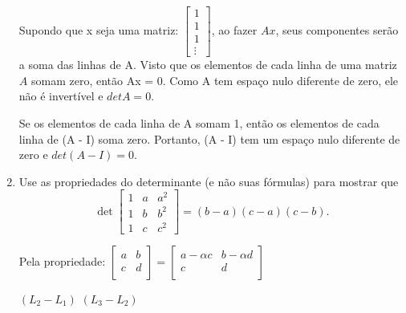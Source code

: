 \documentclass[leqno]{article}
\numberwithin{equation}{section}
\begin{document}
\begin{enumerate}
		\begin{sol}
			Supondo que x seja uma matriz:
			$\begin{bmatrix}
				1 \\
				1 \\
				1 \\
				\vdots
			\end{bmatrix}$, ao fazer $Ax$, seus componentes serão a soma das linhas de A. Visto que os elementos de cada linha de uma matriz $A$ somam zero, então Ax = 0. Como A tem espaço nulo diferente de zero, ele não é invertível e $det A = 0$.
		
			Se os elementos de cada linha de A somam 1, então os elementos de cada
			linha de (A - I) soma zero. Portanto, (A - I) tem um espaço nulo diferente de zero e $det (A - I) = 0$.
			
		\end{sol}
		
		
		\item Use as propriedades do determinante (e não suas fórmulas) para mostrar que
		$$\det \begin{bmatrix} 1 & a & a^2 \\ 1 & b & b^2 \\ 1 & c & c^2 \end{bmatrix} = (b-a)(c-a)(c-b).$$
		
		\begin{sol}
			Pela propriedade: $\begin{bmatrix}
				a & b \\
				c & d \\
			\end{bmatrix} =\begin{bmatrix}
			a - \alpha c & b - \alpha d\\
			c & d \\
			\end{bmatrix} $
			
			$(L_2 - L_1)$
			$(L_3 - L_2)$
			

\end{sol}
\end{enumerate}
\end{document}
